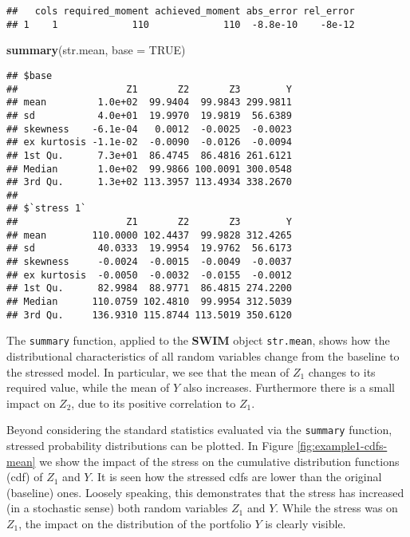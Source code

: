 \documentclass[
]{article}
\newenvironment{Shaded}{\begin{snugshade}}{\end{snugshade}}
\newcommand{\DataTypeTok}[1]{\textcolor[rgb]{0.13,0.29,0.53}{#1}}
\newcommand{\KeywordTok}[1]{\textcolor[rgb]{0.13,0.29,0.53}{\textbf{#1}}}
\newcommand{\NormalTok}[1]{#1}
\newcommand{\OtherTok}[1]{\textcolor[rgb]{0.56,0.35,0.01}{#1}}
\begin{document}
\begin{verbatim}
##   cols required_moment achieved_moment abs_error rel_error
## 1    1             110             110  -8.8e-10    -8e-12
\end{verbatim}

\begin{Shaded}
\begin{Highlighting}[]
\KeywordTok{summary}\NormalTok{(str.mean, }\DataTypeTok{base =} \OtherTok{TRUE}\NormalTok{)}
\end{Highlighting}
\end{Shaded}

\begin{verbatim}
## $base
##                   Z1       Z2       Z3        Y
## mean         1.0e+02  99.9404  99.9843 299.9811
## sd           4.0e+01  19.9970  19.9819  56.6389
## skewness    -6.1e-04   0.0012  -0.0025  -0.0023
## ex kurtosis -1.1e-02  -0.0090  -0.0126  -0.0094
## 1st Qu.      7.3e+01  86.4745  86.4816 261.6121
## Median       1.0e+02  99.9866 100.0091 300.0548
## 3rd Qu.      1.3e+02 113.3957 113.4934 338.2670
## 
## $`stress 1`
##                   Z1       Z2       Z3        Y
## mean        110.0000 102.4437  99.9828 312.4265
## sd           40.0333  19.9954  19.9762  56.6173
## skewness     -0.0024  -0.0015  -0.0049  -0.0037
## ex kurtosis  -0.0050  -0.0032  -0.0155  -0.0012
## 1st Qu.      82.9984  88.9771  86.4815 274.2200
## Median      110.0759 102.4810  99.9954 312.5039
## 3rd Qu.     136.9310 115.8744 113.5019 350.6120
\end{verbatim}

The \texttt{summary} function, applied to the \textbf{SWIM} object \texttt{str.mean}, shows how the distributional characteristics of all random variables change from the baseline to the stressed model. In particular, we see that the mean of \(Z_1\) changes to its required value, while the mean of \(Y\) also increases. Furthermore there is a small impact on \(Z_2\), due to its positive correlation to \(Z_1\).

Beyond considering the standard statistics evaluated via the \texttt{summary} function, stressed probability distributions can be plotted. In Figure \ref{fig:example1-cdfs-mean} we show the impact of the stress on the cumulative distribution functions (cdf) of \(Z_1\) and \(Y\). It is seen how the stressed cdfs are lower than the original (baseline) ones. Loosely speaking, this demonstrates that the stress has increased (in a stochastic sense) both random variables \(Z_1\) and \(Y\). While the stress was on \(Z_1\), the impact on the distribution of the portfolio \(Y\) is clearly visible.
\end{document}
